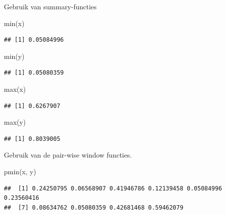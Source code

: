 \documentclass[]{tufte-book}
\newenvironment{Shaded}{}{}
\newcommand{\FunctionTok}[1]{\textcolor[rgb]{0.02,0.16,0.49}{#1}}
\newcommand{\NormalTok}[1]{#1}
\begin{document}
Gebruik van summary-functies

\begin{Shaded}
\begin{Highlighting}[]
\FunctionTok{min}\NormalTok{(x)}
\end{Highlighting}
\end{Shaded}

\begin{verbatim}
## [1] 0.05084996
\end{verbatim}

\begin{Shaded}
\begin{Highlighting}[]
\FunctionTok{min}\NormalTok{(y)}
\end{Highlighting}
\end{Shaded}

\begin{verbatim}
## [1] 0.05080359
\end{verbatim}

\begin{Shaded}
\begin{Highlighting}[]
\FunctionTok{max}\NormalTok{(x)}
\end{Highlighting}
\end{Shaded}

\begin{verbatim}
## [1] 0.6267907
\end{verbatim}

\begin{Shaded}
\begin{Highlighting}[]
\FunctionTok{max}\NormalTok{(y)}
\end{Highlighting}
\end{Shaded}

\begin{verbatim}
## [1] 0.8039005
\end{verbatim}

Gebruik van de pair-wise window functies.

\begin{Shaded}
\begin{Highlighting}[]
\FunctionTok{pmin}\NormalTok{(x, y)}
\end{Highlighting}
\end{Shaded}

\begin{verbatim}
##  [1] 0.24250795 0.06568907 0.41946786 0.12139458 0.05084996 0.23560416
##  [7] 0.08634762 0.05080359 0.42681468 0.59462079
\end{verbatim}
\end{document}
